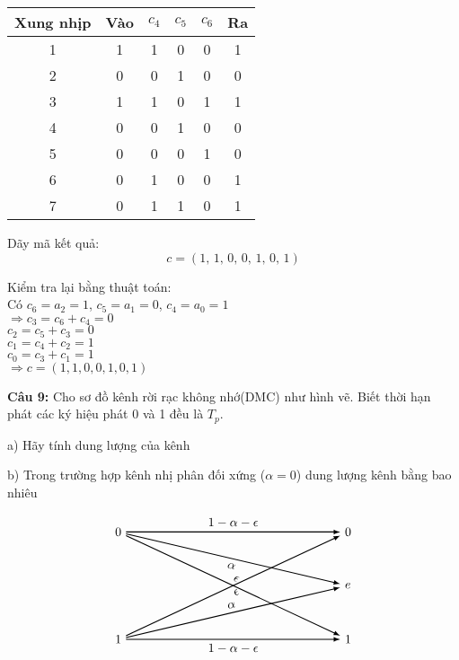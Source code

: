 \documentclass[12pt]{article}
\begin{document}
\begin{center}
\begin{tabular}{|c|c|c|c|c|c|}
\hline
\textbf{Xung nhịp} & \textbf{Vào} & \textbf{$c_4$} & \textbf{$c_5$} & \textbf{$c_6$} & \textbf{Ra} \\
\hline
1 & 1 & 1 & 0 & 0 & 1 \\
2 & 0 & 0 & 1 & 0 & 0 \\
3 & 1 & 1 & 0 & 1 & 1 \\
4 & 0 & 0 & 1 & 0 & 0 \\
5 & 0 & 0 & 0 & 1 & 0 \\
6 & 0 & 1 & 0 & 0 & 1 \\
7 & 0 & 1 & 1 & 0 & 1 \\
\hline
\end{tabular}
\end{center}

Dãy mã kết quả:
\[
c = (1,\,1,\,0,\,0,\,1,\,0,\,1)
\]

Kiểm tra lại bằng thuật toán:\\
Có $c_6 = a_2 = 1$, $c_5 = a_1 = 0$, $c_4 = a_0 = 1$\\
$\Rightarrow c_3 = c_6 + c_4 = 0$\\
\phantom{$\Rightarrow$ }$c_2 = c_5 + c_3 = 0$\\
\phantom{$\Rightarrow$ }$c_1 = c_4 + c_2 = 1$\\
\phantom{$\Rightarrow$ }$c_0 = c_3 + c_1 = 1$\\
$\Rightarrow c = (1, 1, 0, 0, 1, 0, 1)$


\newpage
\textbf{Câu 9: } Cho sơ đồ kênh rời rạc không nhớ(DMC) như hình vẽ. Biết thời hạn phát các ký hiệu phát 0 và 1 đều là $T_p$.

a) Hãy tính dung lượng của kênh 

b) Trong trường hợp kênh nhị phân đối xứng ($\alpha=0$) dung lượng kênh bằng bao nhiêu

\[
\begin{tikzpicture}[>=latex, thick]

\node[left] (x0) at (0,3) {$0$};
\node[left] (x1) at (0,0) {$1$};

\node[right] (y0) at (6,3) {$0$};
\node[right] (y1) at (6,0) {$1$};
\node[right] (ye) at (6,1.5) {$e$};

\draw[->] (x0) -- (y0) node[midway, above] {$1 - \alpha - \epsilon$};
\draw[->] (x0) -- (y1) node[midway, sloped, above] {$\epsilon$};
\draw[->] (x0) -- (ye) node[midway, sloped, below] {$\alpha$};

\draw[->] (x1) -- (y1) node[midway, below] {$1 - \alpha - \epsilon$};
\draw[->] (x1) -- (y0) node[midway, sloped, below] {$\epsilon$};
\draw[->] (x1) -- (ye) node[midway, sloped, above] {$\alpha$};
\end{tikzpicture}
\]
\end{document}
